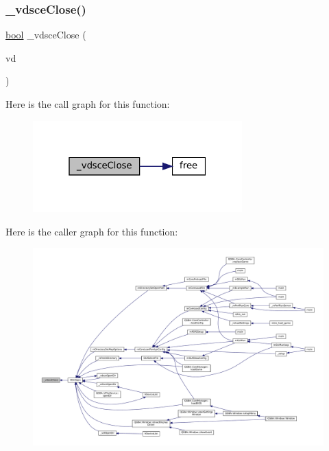 \subsubsection{\texorpdfstring{\+\_\+vdsce\+Close()}{\_vdsceClose()}}
{\footnotesize\ttfamily \mbox{\hyperlink{libretro_8h_a4a26dcae73fb7e1528214a068aca317e}{bool}} \+\_\+vdsce\+Close (\begin{DoxyParamCaption}\item[{struct V\+Dir $\ast$}]{vd }\end{DoxyParamCaption})\hspace{0.3cm}{\ttfamily [static]}}

Here is the call graph for this function\+:
\nopagebreak
\begin{figure}[H]
\begin{center}
\leavevmode
\includegraphics[width=229pt]{sce-vfs_8c_a0117395ca30b8792363d78449fe61630_cgraph}
\end{center}
\end{figure}
Here is the caller graph for this function\+:
\nopagebreak
\begin{figure}[H]
\begin{center}
\leavevmode
\includegraphics[width=350pt]{sce-vfs_8c_a0117395ca30b8792363d78449fe61630_icgraph}
\end{center}
\end{figure}
\mbox{\label{sce-vfs_8c_aaceb97860f376368fc9ba409a19ede70}} 
